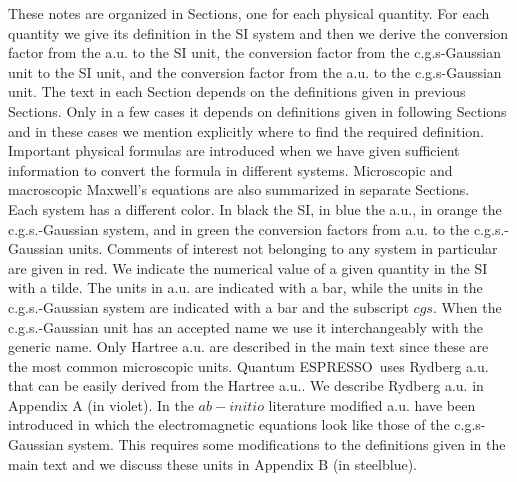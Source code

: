 \documentclass[12pt,a4paper]{article}
\def\qe{{\sc Quantum ESPRESSO}}
\begin{document}
These notes are organized in Sections, one for each physical quantity. 
For each quantity we give its definition in the SI system and then we derive 
the conversion factor from the a.u. to the SI unit, the conversion 
factor from the c.g.s-Gaussian unit to the SI unit, and the conversion 
factor from the a.u. to the c.g.s-Gaussian unit. The text in each Section 
depends on the definitions given in previous Sections. Only in a few cases 
it depends on definitions given in following Sections and in these cases 
we mention explicitly where to find the required definition. Important 
physical formulas are introduced when we have given sufficient information to
convert the formula in different systems. Microscopic and macroscopic 
Maxwell's equations are also summarized in separate Sections. \\
Each system has a different color. In black the SI, in blue the a.u., in 
orange the c.g.s.-Gaussian system, 
and in green the conversion factors from a.u. to the c.g.s.-Gaussian units. 
Comments of interest not belonging to any system in particular are given 
in red. We indicate the numerical value of a given quantity in the SI 
with a tilde. The units in a.u. are indicated with a bar, while the units 
in the c.g.s.-Gaussian system are indicated with a bar and the subscript 
$cgs$. When the c.g.s.-Gaussian unit has an accepted name we use it 
interchangeably with the generic name. Only Hartree a.u. are described 
in the main text since these are the most common microscopic units. 
\qe\ uses Rydberg a.u. that can be easily derived from the Hartree
a.u.. We describe Rydberg a.u. in Appendix A (in violet). In the $ab-initio$
literature modified a.u. have been introduced in which the 
electromagnetic equations look like those of the c.g.s-Gaussian system. 
This requires some modifications to the definitions given in the main 
text and we discuss these units in Appendix B (in steelblue).
\end{document}
